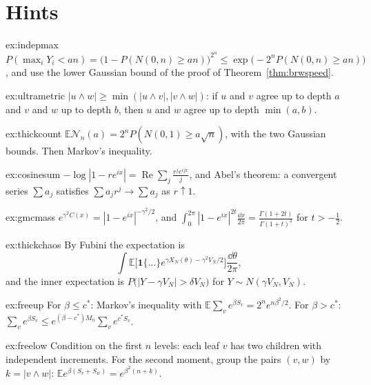 \section{Hints}

\begin{hint}{ex:indepmax}
$P(\max_iY_i<an)=\bigl(1-P(N(0,n)\ge an)\bigr)^{2^n}\le\exp\bigl(-2^nP(N(0,n)\ge an)\bigr)$, and use the lower Gaussian bound of the proof of Theorem~\ref{thm:brwspeed}.
\end{hint}

\begin{hint}{ex:ultrametric}
$|u\wedge w|\ge\min(|u\wedge v|,|v\wedge w|)$: if $u$ and $v$ agree up to depth $a$ and $v$ and $w$ up to depth $b$, then $u$ and $w$ agree up to depth $\min(a,b)$.
\end{hint}

\begin{hint}{ex:thickcount}
$\mathbb E\mathcal N_n(a)=2^nP(N(0,1)\ge a\sqrt n)$, with the two Gaussian bounds. Then Markov's inequality.
\end{hint}

\begin{hint}{ex:cosinesum}
$-\log|1-re^{ix}|=\operatorname{Re}\sum_j\frac{r^je^{ijx}}j$, and Abel's theorem: a convergent series $\sum a_j$ satisfies $\sum a_jr^j\to\sum a_j$ as $r\uparrow1$.
\end{hint}

\begin{hint}{ex:gmcmass}
$e^{\gamma^2C(x)}=|1-e^{ix}|^{-\gamma^2/2}$, and $\int_0^{2\pi}|1-e^{ix}|^{2t}\frac{\dd x}{2\pi}=\frac{\Gamma(1+2t)}{\Gamma(1+t)^2}$ for $t>-\frac12$.
\end{hint}

\begin{hint}{ex:thickchaos}
By Fubini the expectation is
\[
\int\mathbb E\bigl[\mathbf 1\{\dots\}e^{\gamma X_N(\theta)-\gamma^2V_N/2}\bigr]\frac{\dd\theta}{2\pi},
\]
and the inner expectation is $P\bigl(|Y-\gamma V_N|>\delta V_N\bigr)$ for $Y\sim N(\gamma V_N,V_N)$.
\end{hint}

\begin{hint}{ex:freeup}
For $\beta\le c^*$: Markov's inequality with $\mathbb E\sum_ve^{\beta S_v}=2^ne^{n\beta^2/2}$. For $\beta>c^*$: $\sum_ve^{\beta S_v}\le e^{(\beta-c^*)M_n}\sum_ve^{c^*S_v}$.
\end{hint}

\begin{hint}{ex:freelow}
Condition on the first $n$ levels: each leaf $v$ has two children with independent increments. For the second moment, group the pairs $(v,w)$ by $k=|v\wedge w|$: $\mathbb Ee^{\beta(S_v+S_w)}=e^{\beta^2(n+k)}$.
\end{hint}

